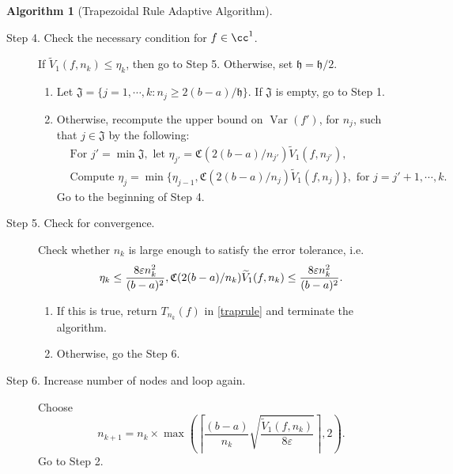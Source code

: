 \documentclass{iitthesis}
\DeclareMathOperator{\Var}{Var}
\theoremstyle{definition}
\newtheorem{algo}{Algorithm}
\theoremstyle{remark}
\begin{document}
\begin{algo}[Trapezoidal Rule Adaptive Algorithm]
\begin{description}
\item[Step 4. Check the necessary condition for $f \in \cc^1$.] If $\widetilde{V}_1(f,n_k) \le \eta_{k}$, then go to Step 5.
  Otherwise, set $\mathfrak{h} = \mathfrak{h}/2$.
    \begin{enumerate}[label=\alph*)]
      \item Let $\mathfrak{J}=\{j=1, \cdots, k: n_{j}\ge 2(b-a)/\mathfrak{h}\}$. If $\mathfrak{J}$ is empty, go to Step 1.
      \item Otherwise, recompute the upper bound on $\Var(f')$, for $n_{j}$, such that $j \in \mathfrak{J}$ by the following:
      \begin{align*}
        &\text{For } j'=\min\mathfrak{J}, \text{ let } \eta_{j'}=\mathfrak{C}(2(b-a)/n_{j'})\widetilde{V}_1(f,n_{j'}), \\
        &\text{Compute } \eta_{j}=\min\{\eta_{j-1},\mathfrak{C}(2(b-a)/n_{j})\widetilde{V}_1(f,n_{j})\}, \text{ for } j=j'+1, \cdots, k.
      \end{align*}
        Go to the beginning of Step 4.
    \end{enumerate}


\item[Step 5. Check for convergence.] Check whether $n_k$ is large enough to satisfy the error tolerance, i.e.
    \begin{equation*}
        \eta_{k} \le \frac{8\varepsilon n_k^2}{(b-a)^2},\\
         \mathfrak{C}(2(b-a)/n_k)\widetilde{V}_1(f,n_k) \le \frac{8\varepsilon n_k^2}{(b-a)^2}.
    \end{equation*}

    \begin{enumerate}[label=\alph*)]
      \item If this is true, return $T_{n_k}(f)$ in \eqref{traprule} and terminate the algorithm.
      \item Otherwise, go the Step 6.
    \end{enumerate}


\item[Step 6. Increase number of nodes and loop again.] Choose
$$
n_{k+1}=n_k\times\max\left(\left\lceil\frac{(b-a)}{n_{k}}\sqrt{\frac{\widetilde{V}_1(f,n_k)}{8\varepsilon}}\right\rceil,2\right).
$$
Go to Step 2.
\end{description}
\end{algo}
\end{document}
